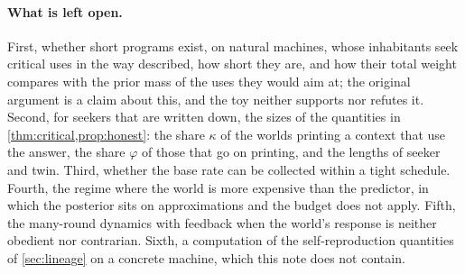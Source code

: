\paragraph{What is left open.} First, whether short programs exist, on natural machines, whose inhabitants
seek critical uses in the way described, how short they are, and how their total weight compares with the
prior mass of the uses they would aim at; the original argument is a claim about this, and the toy neither
supports nor refutes it. Second, for seekers that are written down, the sizes of the quantities in
\cref{thm:critical,prop:honest}: the share $\kappa$ of the worlds printing a context that use the answer, the
share $\varphi$ of those that go on printing, and the lengths of seeker and twin. Third, whether the base rate
can be collected within a tight schedule. Fourth, the regime where the world is more expensive than the
predictor, in which the posterior sits on approximations and the budget does not apply. Fifth, the many-round
dynamics with feedback when the world's response is neither obedient nor contrarian. Sixth, a computation of
the self-reproduction quantities of \cref{sec:lineage} on a concrete machine, which this note does not
contain.
